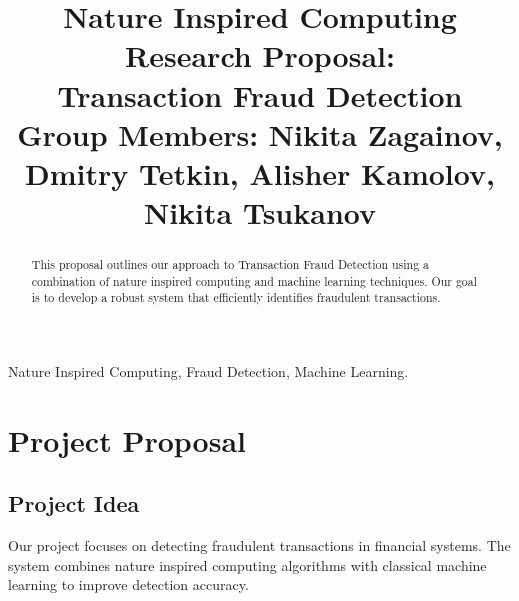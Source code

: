 \documentclass[conference]{IEEEtran}
\begin{document}
\title{Nature Inspired Computing Research Proposal:\\ Transaction Fraud Detection \\ \vspace{0.5em} Group Members: Nikita Zagainov, Dmitry Tetkin, Alisher Kamolov, Nikita Tsukanov}

\author{
    \and
    \and
    \and
}

\maketitle

\begin{abstract}
This proposal outlines our approach to Transaction Fraud Detection using a combination of nature inspired computing and machine learning techniques. Our goal is to develop a robust system that efficiently identifies fraudulent transactions.
\end{abstract}

\begin{IEEEkeywords}
Nature Inspired Computing, Fraud Detection, Machine Learning.
\end{IEEEkeywords}

\section{Project Proposal}

\subsection{Project Idea}
Our project focuses on detecting fraudulent transactions in financial systems. The system combines nature inspired computing algorithms with classical machine learning to improve detection accuracy.
\end{document}
